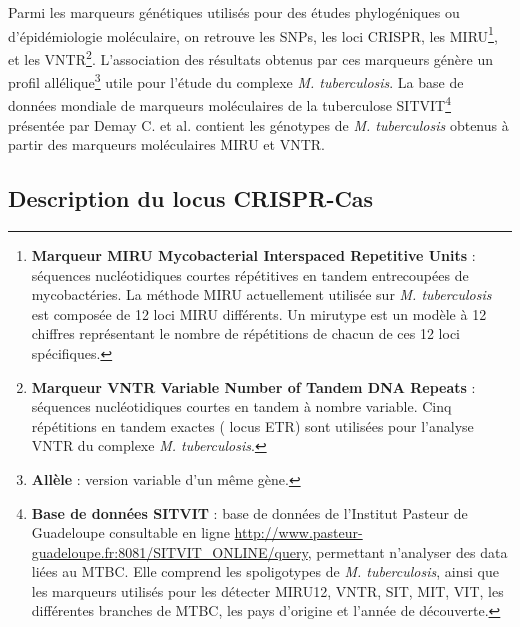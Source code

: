 \documentclass[twoside,a4paper,11pt,frenchb,openany]{report}
\begin{document}
Parmi les marqueurs génétiques utilisés pour des études phylogéniques ou d'épidémiologie moléculaire, on retrouve les SNPs, les loci CRISPR, les MIRU\footnote{\textbf{Marqueur MIRU Mycobacterial Interspaced Repetitive Units} : séquences nucléotidiques courtes répétitives en tandem entrecoupées de mycobactéries. La méthode MIRU actuellement utilisée sur \textit{M. tuberculosis} est composée de 12 loci MIRU différents. Un mirutype est un modèle à 12 chiffres représentant le nombre de répétitions de chacun de ces 12 loci spécifiques.}, et les VNTR\footnote{\textbf{Marqueur VNTR Variable Number of Tandem DNA Repeats} : séquences nucléotidiques courtes en tandem à nombre variable. Cinq répétitions en tandem exactes ( locus ETR) sont utilisées pour l'analyse VNTR du complexe \textit{M. tuberculosis}.}. L'association des résultats obtenus par ces marqueurs génère un profil allélique\footnote{\textbf{Allèle} : version variable d'un même gène.} utile pour l'étude du complexe \textit{M. tuberculosis}. La base de données mondiale de marqueurs moléculaires de la tuberculose SITVIT\footnote{\textbf{Base de données SITVIT} : base de données de l'Institut Pasteur de Guadeloupe consultable en ligne \url{http://www.pasteur-guadeloupe.fr:8081/SITVIT_ONLINE/query}, permettant n'analyser des data liées au MTBC. Elle comprend les spoligotypes de \textit{M. tuberculosis}, ainsi que les marqueurs utilisés pour les détecter MIRU12, VNTR, SIT, MIT, VIT, les différentes branches de MTBC, les pays d'origine et l'année de découverte.} présentée par Demay C. et al.\cite{demay} contient les génotypes de \textit{M. tuberculosis} obtenus à partir des marqueurs moléculaires MIRU et VNTR.


\subsection{Description du locus CRISPR-Cas}
\end{document}
